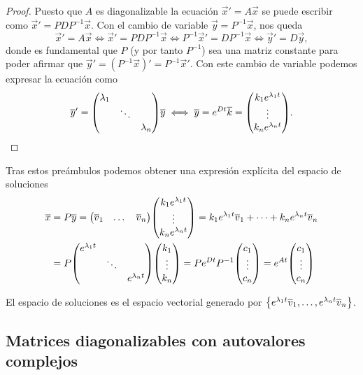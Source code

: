 \documentclass[../ecuaciones_diferenciales.tex]{subfiles}
\begin{document}
\begin{proof}
	Puesto que \(A\) es diagonalizable la ecuación \(\vec{x}' = A\vec{x}\) 
	se puede escribir como
	\(\vec{x}' = P D P^{-1} \vec{x}\). Con el cambio de variable 
	\(\vec{y} = P^{-1}\vec{x}\), nos queda
	\[\vec{x}' = A\vec{x} \iff 
		\vec{x}' = PDP^{-1}\vec{x} \iff 
		P^{-1}\vec{x}' = DP^{-1}\vec{x} \iff \vec{y}' = D\vec{y},\]
	donde es fundamental que \(P\) (y por tanto \(P^{-1}\)) sea una matriz constante
	para poder afirmar que \(\vec{y}' = (P^{-1}\vec{x})' = P^{-1}\vec{x}'\). 
	Con este cambio de variable podemos expresar la ecuación como
	\[\vec{y}' = \mat{\lambda_1 && \\ & \ddots & \\ && \lambda_n} \vec{y} \iff
		\vec{y} = e^{Dt}\vec{k} 
		= \mat{k_1 e^{\lambda_1 t} \\ \vdots \\ k_n e^{\lambda_n t}}.\]
\end{proof}

Tras estos preámbulos podemos obtener
una expresión explícita del espacio de soluciones
\begin{align*}
	\vec{x} &= P\vec{y} = \mat{\vec{v}_1 & \dots & \vec{v}_n} 
		\mat{k_1 e^{\lambda_1 t} \\ \vdots \\ k_n e^{\lambda_n t}} =
	k_1 e^{\lambda_1 t} \vec{v}_1 + \cdots + k_n e^{\lambda_n t}\vec{v}_n \\
	  &= P \mat{e^{\lambda_1 t} & & \\ & \ddots & \\ & & e^{\lambda_n t}}
      \mat{k_1 \\ \vdots \\ k_n} = P e^{D t} P^{-1} \mat{c_1 \\ \vdots \\ c_n} =
      e^{A t} \mat{c_1 \\ \vdots \\ c_n}
\end{align*}

\begin{remark}
	El espacio de soluciones es el espacio vectorial generado por
	\(\set{e^{\lambda_1 t} \vec{v}_1, \dots, e^{\lambda_n t} \vec{v}_n}\).
\end{remark}

\subsection{Matrices diagonalizables con autovalores complejos}
\end{document}
